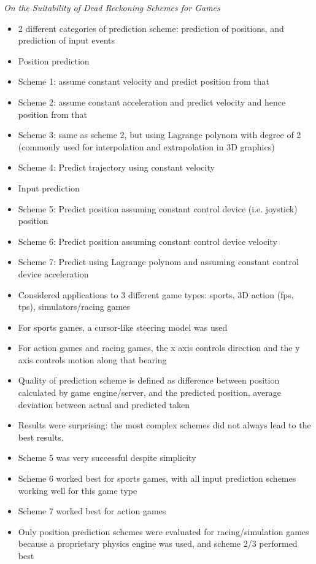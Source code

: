\documentclass[conference]{IEEEtran}
\begin{document}
	\emph{On the Suitability of Dead Reckoning Schemes for Games}

	\begin{itemize}
		\item 2 different categories of prediction scheme: prediction of positions, and prediction of input events
		\item Position prediction
		\item Scheme 1: assume constant velocity and predict position from that
		\item Scheme 2: assume constant acceleration and predict velocity and hence position from that
		\item Scheme 3: same as scheme 2, but using Lagrange polynom with degree of 2 (commonly used for interpolation and extrapolation in 3D graphics)
		\item Scheme 4: Predict trajectory using constant velocity
		\item Input prediction
		\item Scheme 5: Predict position assuming constant control device (i.e. joystick) position
		\item Scheme 6: Predict position assuming constant control device velocity
		\item Scheme 7: Predict using Lagrange polynom and assuming constant control device acceleration
		\item Considered applications to 3 different game types: sports, 3D action (fps, tps), simulators/racing games
		\item For sports games, a cursor-like steering model was used
		\item For action games and racing games, the x axis controls direction and the y axis controls motion along that bearing
		\item Quality of prediction scheme is defined as difference between position calculated by game engine/server, and the predicted position, average deviation between actual and predicted taken
		\item Results were surprising: the most complex schemes did not always lead to the best results.
		\item Scheme 5 was very successful despite simplicity
		\item Scheme 6 worked best for sports games, with all input prediction schemes working well for this game type
		\item Scheme 7 worked best for action games
		\item Only position prediction schemes were evaluated for racing/simulation games because a proprietary physics engine was used, and scheme 2/3 performed best

\end{itemize}
\end{document}
